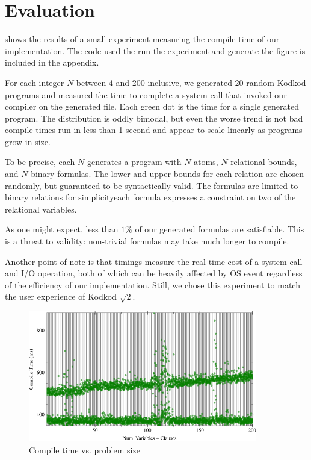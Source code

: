 \section{Evaluation}
\label{sec:eval}

 shows the results of a small experiment measuring the compile
 time of our implementation.
The code used the run the experiment and generate the figure is
 included in the appendix.

For each integer $N$ between 4 and 200 inclusive, we generated 20 random
 Kodkod programs and measured the time to complete a system call that invoked
 our compiler on the generated file.
Each green dot is the time for a single generated program.
The distribution is oddly bimodal, but even the worse trend is not bad\textemdash
 compile times run in less than 1 second and appear to scale linearly as programs
 grow in size.

To be precise, each $N$ generates a program with $N$ atoms, $N$ relational bounds,
 and $N$ binary formulas.
The lower and upper bounds for each relation are chosen randomly, but guaranteed to
 be syntactically valid.
The formulas are limited to binary relations for simplicity\textemdash each
 formula expresses a constraint on two of the relational variables.

As one might expect, less than $1\%$ of our generated formulas are satisfiable.
This is a threat to validity: non-trivial formulas may take much longer to compile.

Another point of note is that timings measure the real-time cost of a system
 call and I/O operation, both of which can be heavily affected by OS event regardless
 of the efficiency of our implementation.
Still, we chose this experiment to match the user experience of Kodkod $\sqrt{2}$.

\begin{figure}
  \includegraphics[width=10cm]{benchmark.png}
  \caption{Compile time vs. problem size}
  \label{fig:bench}
\end{figure}

